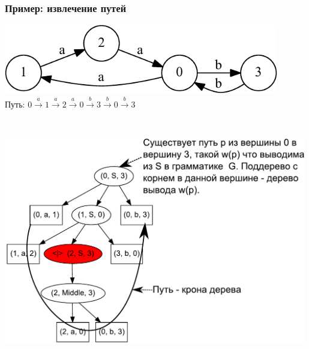 \documentclass[xcolor=table,aspectratio=169]{beamer}
\begin{document}
\begin{frame}[fragile]
  \transwipe[direction=90]
  \frametitle{Пример: извлечение путей}
\begin{center}

\begin{minipage}{0.4\textwidth}
\includegraphics[width=0.9\textwidth]{pictures/input.pdf}
\\
Путь: $0\xrightarrow{a}1\xrightarrow{a}2\xrightarrow{a}0\xrightarrow{b}3\xrightarrow{b}0\xrightarrow{b}3$
\end{minipage}
~
\begin{minipage} {0.57\textwidth}
\includegraphics[width=0.99\textwidth]{pictures/AnBn_2_m.pdf}
\end{minipage}

        
\end{center}                
\end{frame}
\end{document}

